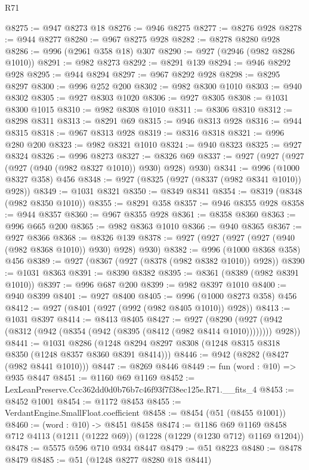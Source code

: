 \begin{lexlean}{R71}
\begin{coremodule}
@8275 := @947 @8273 @18
@8276 := @946 @8275
@8277 := @8276 @928
@8278 := @944 @8277
@8280 := @967 @8275 @928
@8282 := @8278 @8280 @928
@8286 := @996 (@2961 @358 @18) @307
@8290 := @927 (@2946 (@982 @8286 @1010))
@8291 := @982 @8273
@8292 := @8291 @139
@8294 := @946 @8292 @928
@8295 := @944 @8294
@8297 := @967 @8292 @928
@8298 := @8295 @8297
@8300 := @996 @252 @200
@8302 := @982 @8300 @1010
@8303 := @940 @8302
@8305 := @927 @8303 @1020
@8306 := @927 @8305
@8308 := @1031 @8300 @1015
@8310 := @982 @8308 @1010
@8311 := @8306 @8310
@8312 := @8298 @8311
@8313 := @8291 @69
@8315 := @946 @8313 @928
@8316 := @944 @8315
@8318 := @967 @8313 @928
@8319 := @8316 @8318
@8321 := @996 @280 @200
@8323 := @982 @8321 @1010
@8324 := @940 @8323
@8325 := @927 @8324
@8326 := @996 @8273
@8327 := @8326 @69
@8337 := @927 (@927 (@927 (@927 (@940 (@982 @8327 @1010)) @930) @928) @930)
@8341 := @996 (@1000 @8327 @358) @456
@8348 := @927 (@8325 (@927 (@8337 (@982 @8341 @1010)) @928))
@8349 := @1031 @8321
@8350 := @8349 @8341
@8354 := @8319 (@8348 (@982 @8350 @1010))
@8355 := @8291 @358
@8357 := @946 @8355 @928
@8358 := @944 @8357
@8360 := @967 @8355 @928
@8361 := @8358 @8360
@8363 := @996 @665 @200
@8365 := @982 @8363 @1010
@8366 := @940 @8365
@8367 := @927 @8366
@8368 := @8326 @139
@8378 := @927 (@927 (@927 (@927 (@940 (@982 @8368 @1010)) @930) @928) @930)
@8382 := @996 (@1000 @8368 @358) @456
@8389 := @927 (@8367 (@927 (@8378 (@982 @8382 @1010)) @928))
@8390 := @1031 @8363
@8391 := @8390 @8382
@8395 := @8361 (@8389 (@982 @8391 @1010))
@8397 := @996 @687 @200
@8399 := @982 @8397 @1010
@8400 := @940 @8399
@8401 := @927 @8400
@8405 := @996 (@1000 @8273 @358) @456
@8412 := @927 (@8401 (@927 (@992 (@982 @8405 @1010)) @928))
@8413 := @1031 @8397
@8414 := @8413 @8405
@8427 := @927
    (@8290 (@927 (@942 (@8312 (@942 (@8354 (@942 (@8395 (@8412 (@982 @8414 @1010)))))))) @928))
@8441 := @1031
    @8286
    (@1248 @8294 @8297 @8308 (@1248 @8315 @8318 @8350 (@1248 @8357 @8360 @8391 @8414)))
@8446 := @942 (@8282 (@8427 (@982 @8441 @1010)))
@8447 := @8269 @8446
@8449 := fun (word : @10) => @935 @8447
@8451 := @1160 @69 @1169
@8452 := LexLeanPreserve.Ccc362dd0d0b76b7c46f93f7f38ec125e.R71.__fits_4
@8453 := @8452 @1001
@8454 := @1172 @8453
@8455 := VerdantEngine.SmallFloat.coefficient
@8458 := @8454 (@51 (@8455 @1001))
@8460 := (word : @10) -> @8451 @8458
@8474 := @1186
    @69
    @1169
    @8458
    @712
    @4113
    (@1211 (@1222 @69))
    (@1228 (@1229 (@1230 @712) @1169 @1204))
@8478 := @5575 @596 @710 @934 @8447
@8479 := @51 @8223
@8480 := @8478 @8479
@8485 := @51 (@1248 @8277 @8280 @18 @8441)

\end{coremodule}
\end{lexlean}
